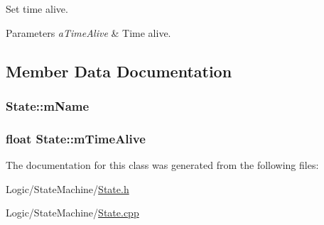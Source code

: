 Set time alive. 


\begin{DoxyParams}{Parameters}
{\em a\+Time\+Alive} & Time alive. \\
\hline
\end{DoxyParams}


\subsection{Member Data Documentation}
\subsubsection[{\texorpdfstring{m\+Name}{mName}}]{ State\+::m\+Name\hspace{0.3cm}{\ttfamily [private]}}\hypertarget{classState_a0322263d0c5c81d068333f4775e83c36}{}\label{classState_a0322263d0c5c81d068333f4775e83c36}
\subsubsection[{\texorpdfstring{m\+Time\+Alive}{mTimeAlive}}]{\setlength{\rightskip}{0pt plus 5cm}float State\+::m\+Time\+Alive\hspace{0.3cm}{\ttfamily [private]}}\hypertarget{classState_aab79a07493e70e7ccad668ce892ec4d7}{}\label{classState_aab79a07493e70e7ccad668ce892ec4d7}


The documentation for this class was generated from the following files\+:\begin{DoxyCompactItemize}
\item 
Logic/\+State\+Machine/\hyperlink{State_8h}{State.\+h}\item 
Logic/\+State\+Machine/\hyperlink{State_8cpp}{State.\+cpp}\end{DoxyCompactItemize}
